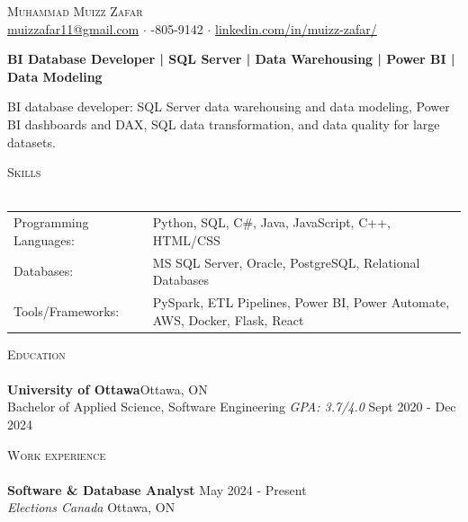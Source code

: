 \documentclass[a4paper]{article}
\newcommand{\lineunder} {
    \vspace*{-8pt} \\
    \hspace*{-18pt} \hrulefill \\
}
\newcommand{\header} [1] {
    {\hspace*{-18pt}\vspace*{6pt} \textsc{#1}}
    \vspace*{-6pt} \lineunder
}
\begin{document}
\vspace*{-40pt}
\vspace*{-10pt}
\begin{center}
	{\Huge \scshape {Muhammad Muizz Zafar}}\\
	\faSend \space \href{mailto:muizzafar11@gmail.com}{muizzafar11@gmail.com} $\cdot$ \faPhoneSquare {}-805-9142 $\cdot$ \faLinkedinSquare \space \href{https://www.linkedin.com/in/muizz-zafar/}{linkedin.com/in/muizz-zafar/}
	\\
\end{center}
\vspace{-5pt}
\begin{center}
\textbf{BI Database Developer | SQL Server | Data Warehousing | Power BI | Data Modeling}
\end{center}
\begin{center}
BI database developer: SQL Server data warehousing and data modeling, Power BI dashboards and DAX, SQL data transformation, and data quality for large datasets.
\end{center}
\header{Skills}
\begin{tabular}{ l l }
	Programming Languages:        & Python, SQL, C\#, Java, JavaScript, C++, HTML/CSS \\
	Databases:                    & MS SQL Server, Oracle, PostgreSQL, Relational Databases \\
	Tools/Frameworks:             & PySpark, ETL Pipelines, Power BI, Power Automate, AWS, Docker, Flask, React \\
\end{tabular}
\vspace{2mm}
\header{Education}
\textbf{University of Ottawa}\hfill Ottawa, ON\\
Bachelor of Applied Science, Software Engineering \textit{GPA: 3.7/4.0} \hfill Sept 2020 - Dec 2024\\
\vspace{2mm}
\header{Work experience}
\vspace{1.5mm}
\textbf{Software \& Database Analyst} \hfill May 2024 - Present\\
\textit{Elections Canada} \hfill Ottawa, ON\\
\vspace{-2mm}
\end{document}
